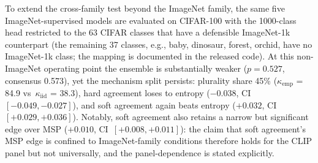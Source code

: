 \documentclass[a4paper,fleqn]{cas-sc}
\begin{document}
To extend the cross-family test beyond the ImageNet family, the same five ImageNet-supervised models are evaluated on CIFAR-100 with the 1000-class head restricted to the 63 CIFAR classes that have a defensible ImageNet-1k counterpart (the remaining 37 classes, e.g., baby, dinosaur, forest, orchid, have no ImageNet-1k class; the mapping is documented in the released code).
At this non-ImageNet operating point the ensemble is substantially weaker ($p{=}0.527$, consensus 0.573), yet the mechanism split persists: plurality share 45\% ($\kappa_{\text{emp}}$ = 84.9 vs~$\kappa_{\text{iid}}$ = 38.3), hard agreement loses to entropy ($-0.038$, CI~$[-0.049,-0.027]$), and soft agreement again beats entropy ($+0.032$, CI~$[+0.029,+0.036]$).
Notably, soft agreement also retains a narrow but significant edge over MSP ($+0.010$, CI~$[+0.008,+0.011]$): the claim that soft agreement's MSP edge is confined to ImageNet-family conditions therefore holds for the CLIP panel but not universally, and the panel-dependence is stated explicitly.
\end{document}
